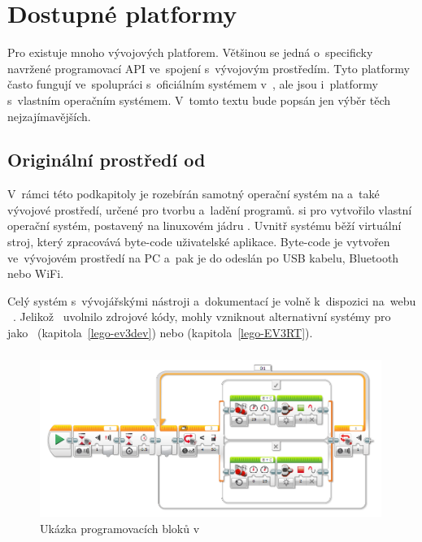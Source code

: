 \chapter{Dostupné platformy}

\label{lego-soft-available-platforms}


Pro \legoEV{} existuje mnoho vývojových platforem. 
Většinou se jedná o~specificky navržené programovací API ve~spojení s~vývojovým prostředím. 
Tyto platformy často fungují ve~spolupráci s~oficiálním systémem v~\EVthree{}, ale jsou i~platformy s~vlastním operačním systémem. 
V~tomto textu bude popsán jen výběr těch nejzajímavějších. %

\section{Originální prostředí od \lego}

V~rámci této podkapitoly je rozebírán samotný operační systém na \EVthree{} a~také vývojové prostředí, určené pro tvorbu a~ladění programů. 
\lego{} si pro \EVthree{} vytvořilo vlastní operační systém, postavený na linuxovém jádru \cite{legoMindstormsEV3_fw-dev-kit}. 
Uvnitř systému běží virtuální stroj, který zpracovává byte-code uživatelské aplikace. 
Byte-code je vytvořen ve~vývojovém prostředí na PC a~pak je do  odeslán po USB kabelu, Bluetooth nebo WiFi.

Celý systém s~vývojářskými nástroji a~dokumentací je volně k~dispozici na~webu \lego{}~\cite{legoMindstorms_download}. Jelikož~\lego{} uvolnilo zdrojové kódy, mohly vzniknout alternativní systémy pro~\EVthree{} jako~\evThreeDev{} (kapitola~\ref{lego-ev3dev}) nebo \evRT{} (kapitola~\ref{lego-EV3RT}). 

\subsection{\legoSW{}}
\label{lego-soft-orig-problems}


\begin{figure}[h]
	\centering
	\includegraphics[width=0.99\textwidth]{images/lego-soft_robotut_switch-touch+motors+leds.png}
	\caption{Ukázka programovacích bloků v~\legoSW}
	\label{fig:lego-soft_example-blocks}
\end{figure}


